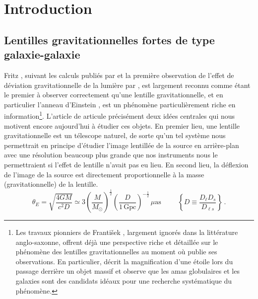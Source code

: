 \chapter{Introduction}\label{chap:intro}
\glsaddall
\thispagestyle{empty}


\section{Lentilles gravitationnelles fortes de type galaxie-galaxie}\label{sec:lentilles gravitationnelles}


Fritz \citet{Zwicky1937}, suivant les calculs publiés par \citet{Einstein1936} et la première observation 
de l'effet de déviation gravitationnelle de la lumière par \citet{Eddington1919}, 
est largement reconnu comme étant le premier à observer correctement qu'une lentille gravitationnelle, et en particulier 
l'anneau d'Einstein \citep{Chwolson1924},
est un phénomène particulièrement riche en information\footnote{ 
        Les travaux pionniers de Franti\v{s}ek \citet{Link1936,Link1937}, largement ignorés dans la littérature anglo-saxonne, %
        offrent déjà une perspective riche et détaillée sur le phénomène des lentilles gravitationnelles au moment où \citet{Zwicky1937} publie 
        ses observations. 
        En particulier, \citet{Link1936} décrit la magnification d'une étoile lors du passage derrière un objet massif et 
        observe que les amas globulaires et les galaxies sont des candidats idéaux pour une recherche systématique du 
        phénomène.
        }. 
L'article de \citet{Zwicky1937} articule précisément deux idées centrales qui nous motivent encore aujourd'hui à 
étudier ces objets. En premier lieu, une lentille gravitationnelle est un télescope naturel, de sorte qu'un tel 
système nous permettrait en principe d'étudier l'image lentillée de la source en arrière-plan avec une résolution beaucoup plus grande que nos instruments 
nous le permettraient si l'effet de lentille n'avait pas eu lieu. En second lieu, la déflexion de l'image de la source 
est directement proportionnelle à la masse (gravitationnelle) de la lentille. 
\begin{equation}\label{eq:Taille Lentille}
        \theta_E = \sqrt{\frac{4 G M}{c^{2} D}} \simeq 3\left( \frac{M}{M_{\odot}} \right)^{\frac{1}{2}} \left( \frac{D}{1\, \mathrm{Gpc}} \right)^{-\frac{1}{2}}\, \mu\mathrm{as} \hspace{1cm} \left\{D \equiv \frac{D_{\ell} D_s}{D_{\ell s}}\right\}\, .
\end{equation}
